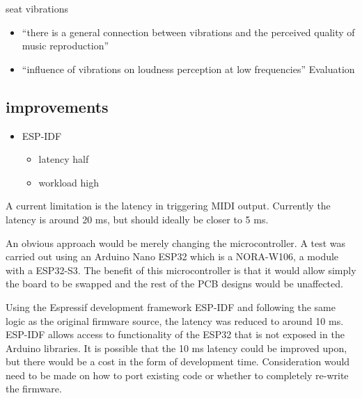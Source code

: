 seat vibrations \cite{MusicalHaptics2018_07}

\begin{itemize}
\item
  ``there is a general connection between vibrations and the perceived
  quality of music reproduction''
\item
  ``influence of vibrations on loudness perception at low frequencies''
  Evaluation
\end{itemize}

\subsection{improvements}\label{improvements}

\begin{itemize}
\item
  ESP-IDF

  \begin{itemize}
  \item
    latency half
  \item
    workload high
  \end{itemize}
\end{itemize}

A current limitation is the latency in triggering MIDI output. Currently
the latency is around 20 ms, but should ideally be closer to 5 ms.

An obvious approach would be merely changing the microcontroller. A test
was carried out using an Arduino Nano ESP32 which is a NORA-W106, a
module with a ESP32-S3. The benefit of this microcontroller is that it
would allow simply the board to be swapped and the rest of the PCB
designs would be unaffected.

Using the Espressif development framework ESP-IDF and following the same
logic as the original firmware source, the latency was reduced to around
10 ms. ESP-IDF allows access to functionality of the ESP32 that is not
exposed in the Arduino libraries. It is possible that the 10 ms latency
could be improved upon, but there would be a cost in the form of
development time. Consideration would need to be made on how to port
existing code or whether to completely re-write the firmware.

